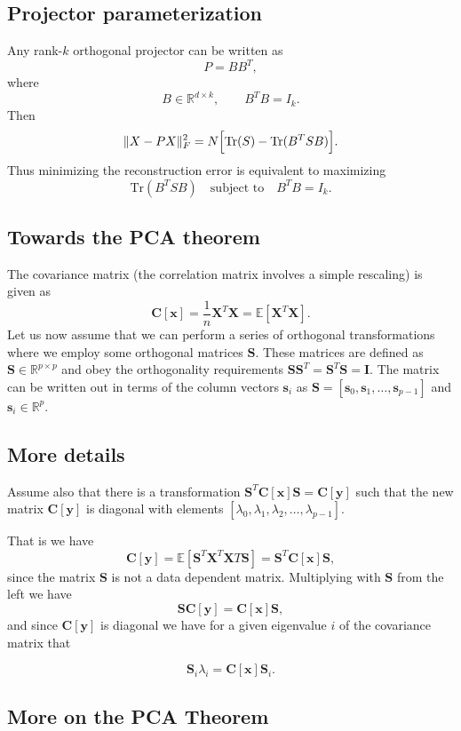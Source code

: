 \documentclass[%
oneside,                 %
final,                   %
10pt]{article}
\begin{document}
\subsection{Projector parameterization}

Any rank-\(k\) orthogonal projector can be written as
\[
P = BB^T,
\]
where
\[
B\in\mathbb{R}^{d\times k},\qquad B^TB=I_k.
\]
Then
\[
\|X-PX\|_F^2
=
N\Bigl[\mathrm{Tr}(S)-\mathrm{Tr}(B^TSB)\Bigr].
\]
Thus minimizing the reconstruction error is equivalent to maximizing
\[
\mathrm{Tr}(B^TSB)
\quad \text{subject to} \quad B^TB=I_k.
\]

\subsection{Towards the PCA theorem}

The covariance matrix (the correlation matrix involves a simple rescaling) is given as
\[
\bm{C}[\bm{x}] = \frac{1}{n}\bm{X}^T\bm{X}= \mathbb{E}[\bm{X}^T\bm{X}].
\]
Let us now assume that we can perform a series of orthogonal transformations where we employ some orthogonal matrices $\bm{S}$.
These matrices are defined as $\bm{S}\in {\mathbb{R}}^{p\times p}$ and obey the orthogonality requirements $\bm{S}\bm{S}^T=\bm{S}^T\bm{S}=\bm{I}$. The matrix can be written out in terms of the column vectors $\bm{s}_i$ as $\bm{S}=[\bm{s}_0,\bm{s}_1,\dots,\bm{s}_{p-1}]$ and $\bm{s}_i \in {\mathbb{R}}^{p}$.

\subsection{More details}

Assume also that there is a transformation $\bm{S}^T\bm{C}[\bm{x}]\bm{S}=\bm{C}[\bm{y}]$ such that the new matrix $\bm{C}[\bm{y}]$ is diagonal with elements $[\lambda_0,\lambda_1,\lambda_2,\dots,\lambda_{p-1}]$.  

That is we have
\[
\bm{C}[\bm{y}] = \mathbb{E}[\bm{S}^T\bm{X}^T\bm{X}T\bm{S}]=\bm{S}^T\bm{C}[\bm{x}]\bm{S},
\]
since the matrix $\bm{S}$ is not a data dependent matrix.   Multiplying with $\bm{S}$ from the left we have
\[
\bm{S}\bm{C}[\bm{y}] = \bm{C}[\bm{x}]\bm{S},
\]
and since $\bm{C}[\bm{y}]$ is diagonal we have for a given eigenvalue $i$ of the covariance matrix that

\[
\bm{S}_i\lambda_i = \bm{C}[\bm{x}]\bm{S}_i.
\]

\subsection{More on the PCA Theorem}
\end{document}
